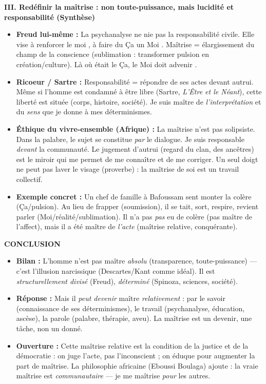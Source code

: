 \documentclass[11pt]{article}
\newcommand{\cle}[1]{{\popxbold\color{popdark}#1}}
\begin{document}
\begin{corrige}
\textbf{III. Redéfinir la maîtrise : non toute-puissance, mais lucidité et responsabilité (Synthèse)}
\begin{itemize}
\item \textbf{Freud lui-même :} La psychanalyse ne nie pas la responsabilité civile. Elle vise à \guillemotleft renforcer le moi \guillemotright, à \guillemotleft faire du Ça un Moi \guillemotright. Maîtrise = \cle{élargissement du champ de la conscience} (sublimation : transformer pulsion en création/culture). \guillemotleft Là où était le Ça, le Moi doit advenir \guillemotright.
\item \textbf{Ricoeur / Sartre :} \cle{Responsabilité} = répondre de ses actes devant autrui. Même si \guillemotleft l'homme est condamné à être libre \guillemotright (Sartre, \emph{L'Être et le Néant}), cette liberté est \cle{située} (corps, histoire, société). Je suis maître de \emph{l'interprétation} et du \emph{sens} que je donne à mes déterminismes.
\item \textbf{Éthique du \guillemotleft vivre-ensemble \guillemotright (Afrique) :} La maîtrise n'est pas solipsiste. Dans la \cle{palabre}, le sujet se constitue \emph{par} le dialogue. Je suis responsable \emph{devant} la communauté. Le \cle{jugement d'autrui} (regard du clan, des ancêtres) est le miroir qui me permet de me connaître et de me corriger. \guillemotleft Un seul doigt ne peut pas laver le visage \guillemotright (proverbe) : la maîtrise de soi est un travail collectif.
\item \textbf{Exemple concret :} Un chef de famille à Bafoussam sent monter la colère (Ça/pulsion). Au lieu de frapper (soumission), il se tait, sort, respire, revient parler (Moi/réalité/sublimation). Il n'a pas \emph{pas} eu de colère (pas maître de l'affect), mais il a été maître de \emph{l'acte} (maîtrise relative, conquérante).
\end{itemize}

\textbf{CONCLUSION}
\begin{itemize}
\item \textbf{Bilan :} L'homme n'est pas maître \emph{absolu} (transparence, toute-puissance) — c'est l'illusion narcissique (Descartes/Kant comme idéal). Il est \emph{structurellement divisé} (Freud), \emph{déterminé} (Spinoza, sciences, société).
\item \textbf{Réponse :} Mais il \emph{peut devenir} maître \emph{relativement} : par le \cle{savoir} (connaissance de ses déterminismes), le \cle{travail} (psychanalyse, éducation, ascèse), la \cle{parole} (palabre, thérapie, aveu). La maîtrise est un \cle{devenir}, une \cle{tâche}, non un \cle{donné}.
\item \textbf{Ouverture :} Cette maîtrise relative est la condition de la \cle{justice} et de la \cle{démocratie} : on juge l'acte, pas l'inconscient ; on éduque pour augmenter la part de maîtrise. La philosophie africaine (Eboussi Boulaga) ajoute : la vraie maîtrise est \emph{communautaire} — je me maîtrise \emph{pour} les autres.
\end{itemize}
\end{corrige}
\end{document}
